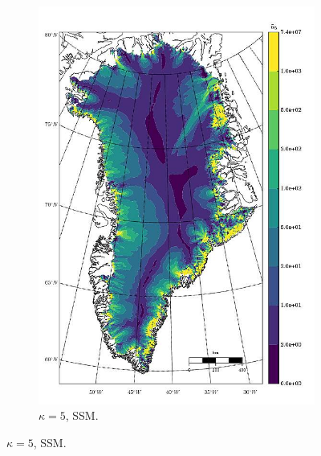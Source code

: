 \begin{figure}
\begin{subfigure}[b]{0.25\linewidth}
    \includegraphics[width=\linewidth]{images/balance_velocity/greenland/Ubar_5H_kappa_5_SSM.jpg}
  \caption{$\kappa = 5$, SSM.}
  \label{greenland_bv_image_kappa_5_SSM}
  \end{subfigure}


\end{figure}
